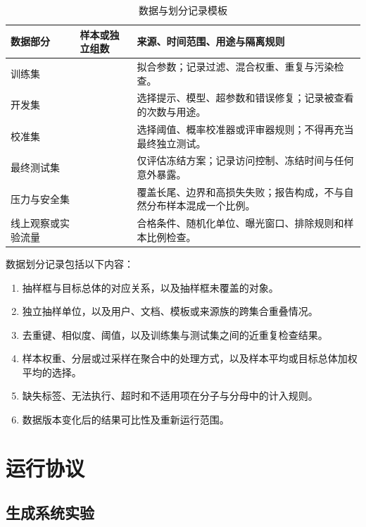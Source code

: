 \documentclass[../workbook.tex]{subfiles}
\begin{document}
\begin{table}[htbp]
\centering
\caption{数据与划分记录模板}\label{tab:appendix-data-splits}
\begin{tabularx}{\linewidth}{p{.21\linewidth}p{.20\linewidth}X}
\toprule
数据部分 & 样本或独立组数 & 来源、时间范围、用途与隔离规则\\\midrule
训练集 &  & 拟合参数；记录过滤、混合权重、重复与污染检查。\\
开发集 &  & 选择提示、模型、超参数和错误修复；记录被查看的次数与用途。\\
校准集 &  & 选择阈值、概率校准器或评审器规则；不得再充当最终独立测试。\\
最终测试集 &  & 仅评估冻结方案；记录访问控制、冻结时间与任何意外暴露。\\
压力与安全集 &  & 覆盖长尾、边界和高损失失败；报告构成，不与自然分布样本混成一个比例。\\
线上观察或实验流量 &  & 合格条件、随机化单位、曝光窗口、排除规则和样本比例检查。\\
\bottomrule
\end{tabularx}
\end{table}

数据划分记录包括以下内容：
\begin{enumerate}
 \item 抽样框与目标总体的对应关系，以及抽样框未覆盖的对象。
 \item 独立抽样单位，以及用户、文档、模板或来源族的跨集合重叠情况。
 \item 去重键、相似度、阈值，以及训练集与测试集之间的近重复检查结果。
 \item 样本权重、分层或过采样在聚合中的处理方式，以及样本平均或目标总体加权平均的选择。
 \item 缺失标签、无法执行、超时和不适用项在分子与分母中的计入规则。
 \item 数据版本变化后的结果可比性及重新运行范围。
\end{enumerate}

\section{运行协议}

\subsection{生成系统实验}
\end{document}

